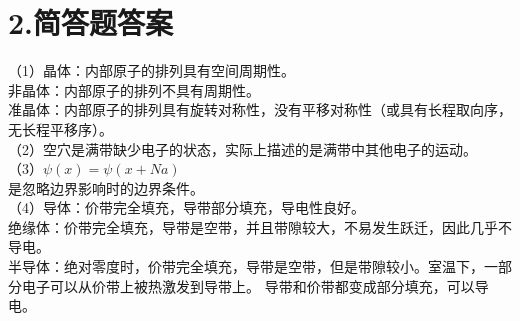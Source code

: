 \documentclass[UTF8]{ctexart}
\begin{document}
\section*{\bfseries 2.简答题答案}
（1）晶体：内部原子的排列具有空间周期性。\\
非晶体：内部原子的排列不具有周期性。\\
准晶体：内部原子的排列具有旋转对称性，没有平移对称性（或具有长程取向序，无长程平移序）。\\
（2）空穴是满带缺少电子的状态，实际上描述的是满带中其他电子的运动。\\
（3）$\psi(x)=\psi(x+Na)$\\
是忽略边界影响时的边界条件。\\
（4）导体：价带完全填充，导带部分填充，导电性良好。\\
绝缘体：价带完全填充，导带是空带，并且带隙较大，不易发生跃迁，因此几乎不导电。\\
半导体：绝对零度时，价带完全填充，导带是空带，但是带隙较小。室温下，一部分电子可以从价带上被热激发到导带上。
导带和价带都变成部分填充，可以导电。
\end{document}
